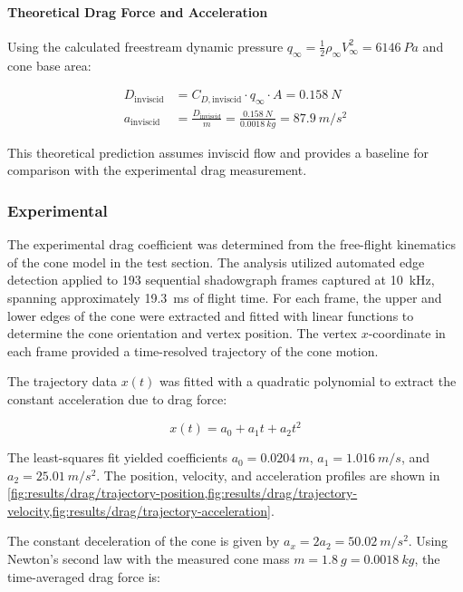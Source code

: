 \paragraph{Theoretical Drag Force and Acceleration}

Using the calculated freestream dynamic pressure $q_\infty = \frac{1}{2}\rho_\infty V_\infty^2 = \qty{6146}{Pa}$ and cone base area:

\begin{align}
    D_{\text{inviscid}} &= C_{D,\text{inviscid}} \cdot q_\infty \cdot A = \qty{0.158}{N} \\
    a_{\text{inviscid}} &= \frac{D_{\text{inviscid}}}{m} = \frac{\qty{0.158}{N}}{\qty{0.0018}{kg}} = \qty{87.9}{m/s^2}
\end{align}

This theoretical prediction assumes inviscid flow and provides a baseline for comparison with the experimental drag measurement.

\subsubsection{Experimental} \label{sec:results/drag/experimental}

The experimental drag coefficient was determined from the free-flight kinematics of the cone model in the test section. The analysis utilized automated edge detection applied to 193 sequential shadowgraph frames captured at \qty{10}{kHz}, spanning approximately \qty{19.3}{ms} of flight time. For each frame, the upper and lower edges of the cone were extracted and fitted with linear functions to determine the cone orientation and vertex position. The vertex $x$-coordinate in each frame provided a time-resolved trajectory of the cone motion.

The trajectory data $x(t)$ was fitted with a quadratic polynomial to extract the constant acceleration due to drag force:

\begin{equation}
    x(t) = a_0 + a_1 t + a_2 t^2
\end{equation}

The least-squares fit yielded coefficients $a_0 = \qty{0.0204}{m}$, $a_1 = \qty{1.016}{m/s}$, and $a_2 = \qty{25.01}{m/s^2}$. The position, velocity, and acceleration profiles are shown in \cref{fig:results/drag/trajectory-position,fig:results/drag/trajectory-velocity,fig:results/drag/trajectory-acceleration}.

The constant deceleration of the cone is given by $a_x = 2a_2 = \qty{50.02}{m/s^2}$. Using Newton's second law with the measured cone mass $m = \qty{1.8}{g} = \qty{0.0018}{kg}$, the time-averaged drag force is:

